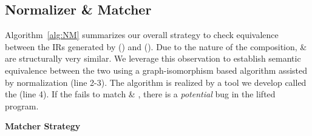 \subsection{Normalizer \& Matcher}\label{sec:matcher}
Algorithm~\ref{alg:NM} summarizes our overall strategy to check equivalence 
between the IRs generated by \mcsema (\T) and \compd (\TP). Due to the nature 
of the composition, \T \& \TP are structurally very similar. 
We leverage this observation to establish 
semantic equivalence between the two using a graph-isomorphism based 
algorithm assisted by 
normalization (line 2-3).  The algorithm is realized by a tool 
we develop called the \matcher (line 4). If the   
\matcher fails to match \T \& \TP, there is a \emph{potential} bug in the lifted program. 
\newcommand\mycommfont[1]{\footnotesize\textcolor{blue}{#1}}
\begin{algorithm}
    
    
    \BlankLine
  
    \caption{\textbf{Matcher Strategy}}\label{alg:NM}
\end{algorithm}

